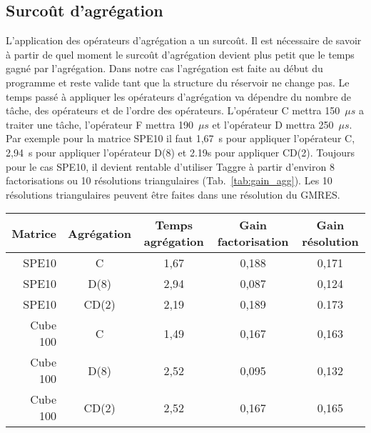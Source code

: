 \subsection{Surcoût d'agrégation}
L'application des opérateurs d'agrégation a un surcoût.
%
Il est nécessaire de savoir à partir de quel moment le surcoût d'agrégation devient plus petit que le temps gagné par l'agrégation.
%
Dans notre cas l'agrégation est faite au début du programme et reste valide tant que la structure du réservoir ne change pas.
%
Le temps passé à appliquer les opérateurs d'agrégation va dépendre du nombre de tâche, des opérateurs et de l'ordre des opérateurs.
%
L'opérateur C mettra 150~$\mu{s}$ a traiter une tâche, l'opérateur F mettra 190~$\mu{s}$ et l'opérateur D mettra 250~$\mu{s}$.
%
Par exemple pour la matrice SPE10 il faut 1,67~s pour appliquer l'opérateur C, 2,94~s pour appliquer l'opérateur D(8) et 2.19s pour appliquer CD(2).
%
Toujours pour le cas SPE10, il devient rentable d'utiliser Taggre à partir d'environ 8 factorisations ou 10 résolutions triangulaires (Tab.~\ref{tab:gain_agg}).
%
Les 10 résolutions triangulaires peuvent être faites dans une résolution du GMRES.

\begin{center}
  \begin{tabular}{ | r | c || c | c | c | }
    \hline
    Matrice & Agrégation & Temps agrégation & Gain factorisation & Gain résolution \\
    \hline
    \hline
    SPE10   &      C     & 1,67          & 0,188          & 0,171 \\
    \hline
    SPE10   &    D(8)    & 2,94          & 0,087          & 0,124 \\
    \hline
    SPE10   &    CD(2)   & 2,19          & 0,189          & 0.173 \\
    \hline
    \hline
    Cube 100&      C     & 1,49          & 0,167          & 0,163 \\
    \hline
    Cube 100&    D(8)    & 2,52          & 0,095          & 0,132 \\
    \hline
    Cube 100&    CD(2)   & 2,52          & 0,167          & 0,165 \\
    \hline
  \end{tabular}
  \label{tab:gain_agg}
\end{center}
